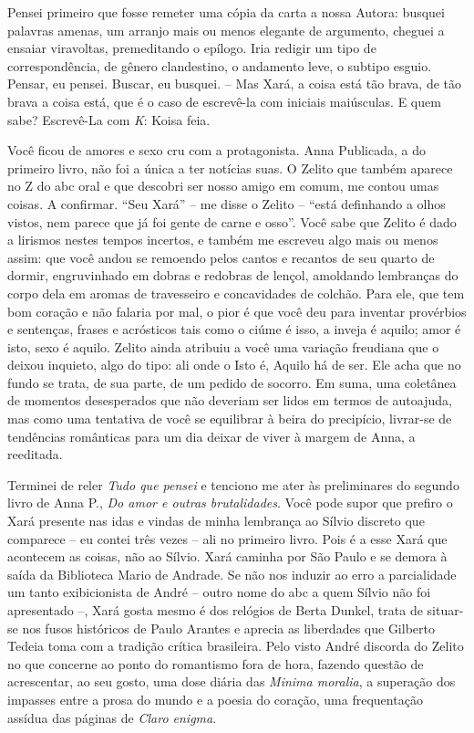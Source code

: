 Pensei primeiro que fosse remeter uma cópia da carta a nossa Autora:
busquei palavras amenas, um arranjo mais ou menos elegante de argumento,
cheguei a ensaiar viravoltas, premeditando o epílogo. Iria redigir um
tipo de correspondência, de gênero clandestino, o andamento leve, o
subtipo esguio. Pensar, eu pensei. Buscar, eu busquei. -- Mas Xará, a
coisa está tão brava, de tão brava a coisa está, que é o caso de
escrevê-la com iniciais maiúsculas. E quem sabe? Escrevê-La com
\emph{K}: Koisa feia.

Você ficou de amores e sexo cru com a protagonista. Anna Publicada, a do
primeiro livro, não foi a única a ter notícias suas. O Zelito que também
aparece no Z do abc oral e que descobri ser nosso amigo em comum, me
contou umas coisas. A confirmar. ``Seu Xará'' -- me disse o Zelito --
``está definhando a olhos vistos, nem parece que já foi gente de carne e
osso''. Você sabe que Zelito é dado a lirismos nestes tempos incertos, e
também me escreveu algo mais ou menos assim: que você andou se remoendo
pelos cantos e recantos de seu quarto de dormir, engruvinhado em dobras
e redobras de lençol, amoldando lembranças do corpo dela em aromas de
travesseiro e concavidades de colchão. Para ele, que tem bom coração e
não falaria por mal, o pior é que você deu para inventar provérbios e
sentenças, frases e acrósticos tais como o ciúme é isso, a inveja é
aquilo; amor é isto, sexo é aquilo. Zelito ainda atribuiu a você uma
variação freudiana que o deixou inquieto, algo do tipo: ali onde o Isto
é, Aquilo há de ser. Ele acha que no fundo se trata, de sua parte, de um
pedido de socorro. Em suma, uma coletânea de momentos desesperados que
não deveriam ser lidos em termos de autoajuda, mas como uma tentativa de
você se equilibrar à beira do precipício, livrar-se de tendências
românticas para um dia deixar de viver à margem de Anna, a reeditada.

Terminei de reler \emph{Tudo que pensei} e tenciono me ater às
preliminares do segundo livro de Anna P., \emph{Do amor e outras
brutalidades}. Você pode supor que prefiro o Xará presente nas idas e
vindas de minha lembrança ao Sílvio discreto que comparece -- eu contei
três vezes -- ali no primeiro livro. Pois é a esse Xará que acontecem as
coisas, não ao Sílvio. Xará caminha por São Paulo e se demora à saída da
Biblioteca Mario de Andrade. Se não nos induzir ao erro a parcialidade
um tanto exibicionista de André -- outro nome do abc a quem Sílvio não
foi apresentado --, Xará gosta mesmo é dos relógios de Berta Dunkel,
trata de situar-se nos fusos históricos de Paulo Arantes e aprecia as
liberdades que Gilberto Tedeia toma com a tradição crítica brasileira.
Pelo visto André discorda do Zelito no que concerne ao ponto do
romantismo fora de hora, fazendo questão de acrescentar, ao seu gosto,
uma dose diária das \emph{Minima moralia}, a superação dos impasses
entre a prosa do mundo e a poesia do coração, uma frequentação assídua
das páginas de \emph{Claro enigma}.

